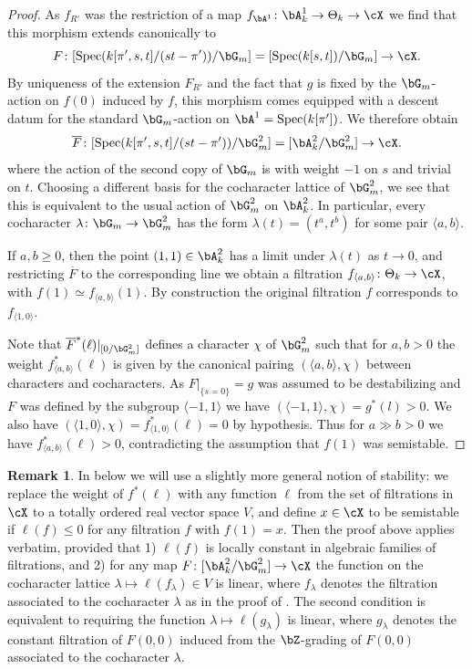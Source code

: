 \documentclass[a4paper]{amsart}
\numberwithin{equation}{section}
\theoremstyle{plain}
\theoremstyle{definition}
\newtheorem{rem}[thm]{Remark}
\DeclareMathOperator{\Spec}{Spec}
\newcommand{\co}{\colon}
\begin{document}
\begin{proof}
As $f_{R'}$ was the restriction of a map $f_{\bA^1} \co \bA_{k}^1 \to \Theta_{k} \to \cX$ we find that this morphism extends canonically to
$$ F \co [\Spec(k[\pi^\prime,s,t]/(st-\pi^\prime))/\bG_m] = [\Spec(k[s,t]) / \bG_m] \to \cX.$$
By uniqueness of the extension $F_{R'}$ and the fact that $g$ is fixed by the $\bG_m$-action on $f(0)$ induced by $f$, this morphism comes equipped with a descent datum for the standard $\bG_m$-action on $\bA^1=\Spec(k[\pi^\prime])$. We therefore obtain
$$ \overline{F} \co [\Spec(k[\pi^\prime,s,t]/(st-\pi^\prime))/\bG_m^2] = [\bA^2_k / \bG_m^2] \to \cX.$$
where the action of the second copy of $\bG_m$ is with weight $-1$ on $s$ and trivial on $t$. Choosing a different basis for the cocharacter lattice of $\bG_m^2$, we see that this is equivalent to the usual action of $\bG_m^2$ on $\bA_k^2$. In particular, every cocharacter $\lambda\co \bG_m \to \bG_m^2$ has the form $\lambda(t) = (t^a,t^b)$ for some pair $\langle a,b\rangle$.

If $a,b \geq 0$, then the point $(1,1) \in \bA^2_k$ has a limit under $\lambda(t)$ as $t\to 0$, and restricting $\overline{F}$ to the corresponding line we obtain a filtration $f_{\langle a,b\rangle}\co \Theta_k \to \cX$, with $f(1) \simeq f_{\langle a,b\rangle}(1)$. By construction the original filtration $f$ corresponds to $f_{\langle1,0\rangle}$.

Note that $\overline{F}^\ast(\ell)|_{[0/\bG_m^2]}$ defines a character $\chi$ of $\bG_m^2$ such that for $a,b>0$ the weight $f^*_{\langle a,b\rangle}(\ell)$ is given by the canonical pairing $(\langle a,b\rangle, \chi)$ between characters and cocharacters. As $F|_{\{s=0\}}=g$ was assumed to be destabilizing and $F$ was defined by the subgroup $\langle -1,1\rangle$ we have $(\langle -1,1 \rangle, \chi) = g^*(l) >0$. We also have $(\langle1,0\rangle,\chi) = f_{\langle 1,0\rangle}^\ast(\ell) = 0$ by hypothesis. Thus for $a\gg b > 0$ we have $f^*_{\langle a,b\rangle}(\ell) >0$, contradicting the assumption that $f(1)$ was semistable.
\end{proof}


\begin{rem} \label{R:more_general_stability}
In  below we will use a slightly more general notion of stability: we replace the weight of $f^\ast(\ell)$ with any function $\ell$ from the set of filtrations in $\cX$ to a totally ordered real vector space $V$, and define $x \in \cX$ to be semistable if $\ell(f) \leq 0$ for any filtration $f$ with $f(1) = x$. Then the proof above applies verbatim, provided that 1) $\ell(f)$ is locally constant in algebraic families of filtrations, and 2) for any map $F \co [\bA^2_k / \bG_m^2] \to \cX$ the function on the cocharacter lattice $\lambda \mapsto \ell(f_\lambda) \in V$ is linear, where $f_\lambda$ denotes the filtration associated to the cocharacter $\lambda$ as in the proof of . The second condition is equivalent to requiring the function $\lambda \mapsto \ell(g_\lambda)$ is linear, where $g_\lambda$ denotes the constant filtration of $F(0,0)$ induced from the $\bZ$-grading of $F(0,0)$ associated to the cocharacter $\lambda$.
\end{rem}
\end{document}

